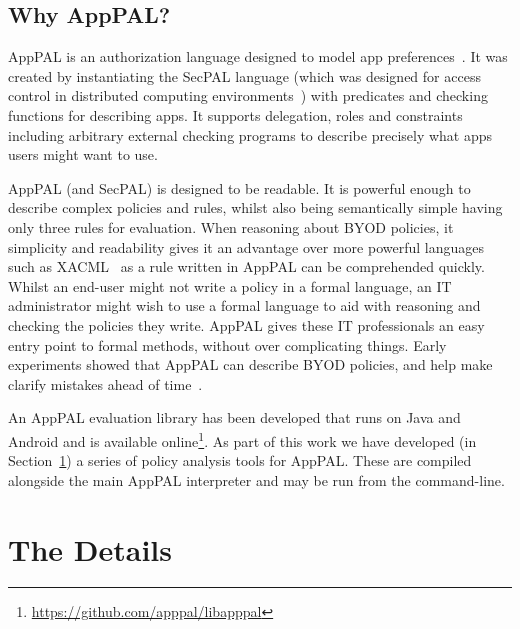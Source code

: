 \documentclass[a4paper]{article}
\begin{document}

\subsection{Why AppPAL?}

AppPAL is an authorization language designed to model app preferences~\cite{hallett_apppal_2016}.
It was created by instantiating the SecPAL language (which was designed for access control in distributed computing environments~\cite{becker_secpal:_2010}) with predicates and checking functions for describing apps.
It supports delegation, roles and constraints including arbitrary external checking programs to describe precisely what apps users might want to use.

AppPAL (and SecPAL) is designed to be readable.
It is powerful enough to describe complex policies and rules, whilst also being semantically simple having only three rules for evaluation.
When reasoning about \ac{BYOD} policies, it simplicity and readability gives it an advantage over more powerful languages such as XACML~\cite{oasis_extensible_2013} as a rule written in AppPAL can be comprehended quickly.
Whilst an end-user might not write a policy in a formal language, an IT administrator might wish to use a formal language to aid with reasoning and checking the policies they write.
AppPAL gives these IT professionals an easy entry point to formal methods, without over complicating things.
Early experiments showed that AppPAL can describe \ac{BYOD} policies, and help make clarify mistakes ahead of time~\cite{hallett_specifying_2016}.

An AppPAL evaluation library has been developed that runs on Java and Android and is available online\footnote{\url{https://github.com/apppal/libapppal}}.
As part of this work we have developed (in Section~\ref{sec:details}) a series of policy analysis tools for AppPAL.
These are compiled alongside the main AppPAL interpreter and may be run from the command-line.

\section{The Details}
\label{sec:details}
\end{document}
